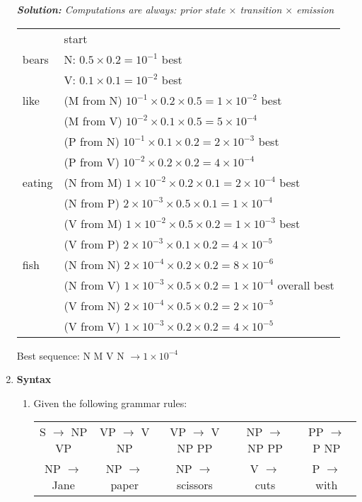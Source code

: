 \documentclass[12pt]{article}
\begin{document}
\begin{enumerate}
{\em{\bf  Solution:} Computations are always: prior state $\times$ transition $\times$ emission\\
\begin{tabular}{ll}
& {\sc start} \\
bears & N: $0.5 \times 0.2 = 10^{-1}$  {\sc best}\\
           & V: $0.1 \times 0.1 = 10^{-2}$  {\sc best}\\
like & (M from N) $10^{-1} \times 0.2 \times 0.5 = 1\times 10^{-2}$ {\sc best} \\
        & (M from V) $10^{-2} \times 0.1 \times 0.5 = 5\times 10^{-4}$ \\
        & (P from N) $10^{-1} \times 0.1 \times 0.2 = 2\times 10^{-3}$ {\sc best} \\
        & (P from V) $10^{-2} \times 0.2 \times 0.2 = 4\times 10^{-4}$ \\
eating & (N from M) $1\times 10^{-2} \times 0.2 \times 0.1 = 2\times 10^{-4}$ {\sc best}\\
            & (N from P) $2\times 10^{-3} \times 0.5 \times 0.1 = 1\times 10^{-4}$ \\
            & (V from M) $1\times 10^{-2} \times 0.5 \times 0.2 = 1\times 10^{-3}$ {\sc best}\\
            & (V from P) $2\times 10^{-3} \times 0.1 \times 0.2 = 4\times 10^{-5}$ \\
fish & (N from N) $2\times 10^{-4} \times 0.2 \times 0.2 = 8\times 10^{-6}$ \\
        & (N from V) $1\times 10^{-3} \times 0.5 \times 0.2 = 1\times 10^{-4}$  {\sc overall best} \\
        & (V from N) $2\times 10^{-4} \times 0.5 \times 0.2 = 2\times 10^{-5}$ \\
        & (V from V) $1\times 10^{-3} \times 0.2 \times 0.2 = 4\times 10^{-5}$ \\
\end{tabular}

Best sequence: N M V N $\rightarrow 1\times 10^{-4}$
} 

\newpage
\item {\bf Syntax}

\begin{enumerate}

\item Given the following grammar rules: 

{\small \begin{tabular}{ccccc}
S $\rightarrow$ NP VP &
VP $\rightarrow$ V NP &
VP $\rightarrow$ V NP PP &
NP $\rightarrow$ NP PP &
PP $\rightarrow$ P NP\\
NP $\rightarrow$ Jane &
NP $\rightarrow$ paper &
NP $\rightarrow$ scissors &
V $\rightarrow$ cuts &
P $\rightarrow$ with\\
\end{tabular}}


\end{enumerate}
\end{enumerate}
\end{document}
